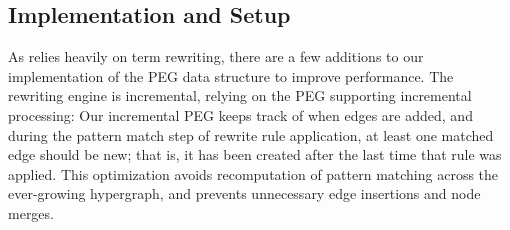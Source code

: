 \subsection{Implementation and Setup}
\label{results:implementation}

As \TheSy relies heavily on term rewriting, there are a few additions to our implementation of the PEG data structure to improve performance.
The rewriting engine is incremental, relying on the PEG supporting incremental processing:
Our incremental PEG keeps track of when edges are added, and during the pattern match step of rewrite rule application, at least one matched edge should be new; that is, it has been created after the last time that rule was applied.
This optimization avoids recomputation of pattern matching across the ever-growing hypergraph, and prevents unnecessary edge insertions and node merges.

\begin{comment}
When running SOE, all the different symbolic valuations are inserted into the hypergraph at once, 
and the hypergraph is duplicated for each valuation to keep terms on different valuations distinct.
By combining the duplicated hypergraphs into one, there is sharing of the symbolic term evaluation for all valuations.
We reuse uninterpreted values when creating larger symbolic expressions (actually, the whole example is reused). 
By which taking advantage of the term sharing to reduce the amount of rewriting needed.

For example consider the valuations for list $[], [x], [y,x]$, both $[]$ and $[x]$ are reused.
As a result, when evaluating a term, for example $rev$, less steps are needed as it reuses the calculations for the smaller valuation.
\[ rev([]) \rwto [] \quad rev([x]) \rwto rev([]) :+ x \quad rev([y,x]) \rwto rev([x]) :+ y \]
\end{comment}

\begin{comment}
\TheSy also applies different rewrite rules in parallel, providing some additional speedup.
This speedup is vital when the knowledge base grows, meaning more lemmas exist, as each lemma gets translated into a rewrite rule.
By matching and concluding in parallel, rules that are irrelevant to the current context fail to match instantly and do not slow down execution.
The compaction operation, however, is sequential, and it currently dominates the running time.
There is definitely room for further implementation improvements to accelerate the performance-critical parts.
\end{comment}

